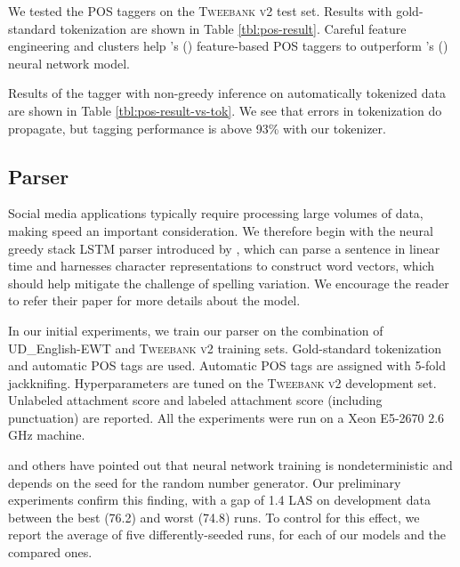 \documentclass[11pt,a4paper]{article}
\newcommand{\citeposs}[2][]{\citeauthor{#2}'s (\citeyear[#1]{#2})}
\begin{document}
We tested the POS taggers on the \textsc{Tweebank v2} test set.  Results
with gold-standard tokenization are shown in
Table \ref{tbl:pos-result}. Careful feature engineering and 
\citet{Brown:1992:CNG:176313.176316} clusters  
help \citeposs{owoputi-EtAl:2013:NAACL-HLT} feature-based POS taggers to outperform \citeposs{ma-hovy:2016:P16-1} neural network
model. 


Results of the \citet{owoputi-EtAl:2013:NAACL-HLT}  tagger with non-greedy
inference on automatically tokenized data
are shown in  Table \ref{tbl:pos-result-vs-tok}.  We see that errors
in tokenization do propagate, but tagging performance is above 93\%
with our tokenizer. 

\subsection{Parser}

Social media applications typically require processing large volumes
of data, making speed an important consideration. We therefore 
begin with the neural greedy stack LSTM parser introduced by \citet{ballesteros-dyer-smith:2015:EMNLP},
which can parse a sentence in linear time and harnesses 
character representations to construct word vectors, which should help mitigate the challenge of
spelling variation. We encourage the reader to refer their paper for
more details about the model.

In our initial experiments, we train our parser on the combination of UD\_English-EWT
and \textsc{Tweebank v2} training sets. Gold-standard tokenization and automatic POS
tags are used. Automatic POS tags are assigned with 5-fold
jackknifing. Hyperparameters are tuned on the \textsc{Tweebank v2} development set. Unlabeled attachment score and
labeled attachment score (including punctuation) are reported.
All the experiments were run on a Xeon E5-2670 2.6 GHz machine.

\citet{reimers-gurevych:2017:EMNLP2017} and others have
pointed out that neural network training is 
nondeterministic and depends on the seed for the random
number generator.
Our preliminary experiments confirm this finding, with a gap of 1.4 LAS on development data
between the best (76.2)
 and worst (74.8) runs. To control for this
effect, we report the average of five differently-seeded runs, for
each of our models and the compared ones.
\end{document}
